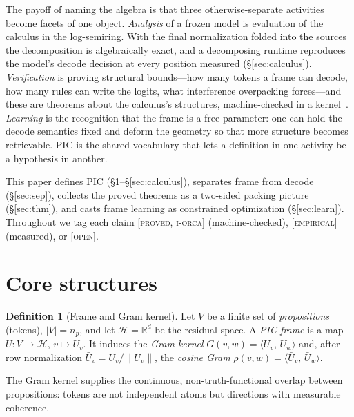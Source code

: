 \documentclass[11pt]{article}
\theoremstyle{definition}
\newtheorem{definition}{Definition}[section]
\theoremstyle{plain}
\theoremstyle{remark}
\newcommand{\proved}{\textsc{[proved, i-orca]}}
\newcommand{\empirical}{\textsc{[empirical]}}
\newcommand{\open}{\textsc{[open]}}
\newcommand{\HH}{\mathcal{H}}
\newcommand{\RR}{\mathbb{R}}
\newcommand{\inner}[2]{\langle #1,\, #2\rangle}
\newcommand{\Uframe}{U}
\newcommand{\Gram}{G}
\begin{document}
The payoff of naming the algebra is that three otherwise-separate activities become facets of one
object. \emph{Analysis} of a frozen model is evaluation of the calculus in the log-semiring. With the
final normalization folded into the sources the decomposition is algebraically exact, and a decomposing
runtime reproduces the model's decode decision at every position measured (\S\ref{sec:calculus}).
\emph{Verification} is proving structural bounds---how many tokens a frame can decode, how many rules can
write the logits, what interference overpacking forces---and these are theorems about the calculus's
structures, machine-checked in a kernel~\cite{nipkow2002isabelle}. \emph{Learning} is the recognition that the frame is a free
parameter: one can hold the decode semantics fixed and deform the geometry so that more structure becomes
retrievable. PIC is the shared vocabulary that lets a definition in one activity be a hypothesis in
another.

This paper defines PIC (\S\ref{sec:core}--\S\ref{sec:calculus}), separates frame from decode
(\S\ref{sec:sep}), collects the proved theorems as a two-sided packing picture (\S\ref{sec:thm}), and
casts frame learning as constrained optimization (\S\ref{sec:learn}). Throughout we tag each claim
\proved{} (machine-checked), \empirical{} (measured), or \open{}.

\section{Core structures}\label{sec:core}

\begin{definition}[Frame and Gram kernel]
Let $V$ be a finite set of \emph{propositions} (tokens), $|V|=n_p$, and let $\HH=\RR^d$ be the residual
space. A \emph{PIC frame} is a map $\Uframe:V\to\HH$, $v\mapsto U_v$. It induces the \emph{Gram kernel}
$\Gram(v,w)=\inner{U_v}{U_w}$ and, after row normalization $\bar U_v=U_v/\lVert U_v\rVert$, the
\emph{cosine Gram} $\rho(v,w)=\inner{\bar U_v}{\bar U_w}$.
\end{definition}

The Gram kernel supplies the continuous, non-truth-functional overlap between propositions: tokens are
not independent atoms but directions with measurable coherence.
\end{document}
